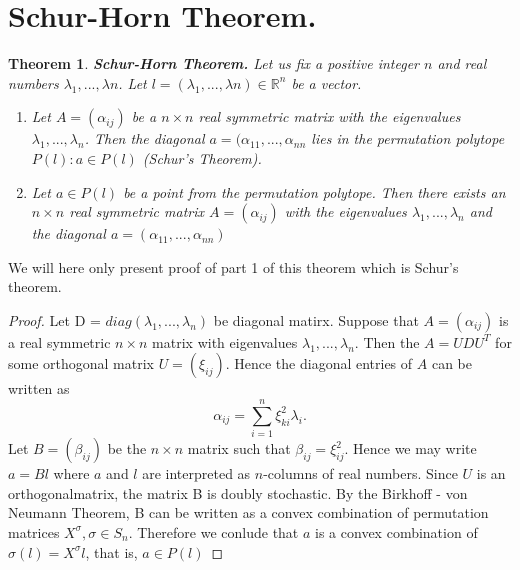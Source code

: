 \documentclass[11pt]{article}
\theoremstyle{plain}
\newtheorem{theorem}[thm]{Theorem}
\theoremstyle{definition}
\begin{document}
\section{Schur-Horn Theorem.}
\begin{theorem}\cite{Convexity}
    \textbf{Schur-Horn Theorem.} Let us fix a positive integer $n$ and real numbers $\lambda_{1},...,\lambda{n}$. Let $l=(\lambda_{1},...,\lambda{n}) \in \mathbb{R}^n$ be a vector.
    \begin{enumerate}
        \item [1.] Let $A=(\alpha_{ij})$ be a $n\times n$ real symmetric matrix with the eigenvalues $\lambda_{1},...,\lambda_{n}$. Then the diagonal $a = (\alpha_{11},...,\alpha_{nn}$ lies in the permutation polytope $P(l): a \in P(l)$ (Schur's Theorem).
        \item[2.] Let $a \in P(l)$ be a point from the permutation polytope. Then there exists an $n \times n$ real symmetric matrix $A=(\alpha_{ij})$ with the eigenvalues $\lambda_{1},...,\lambda_{n}$ and the diagonal $a = (\alpha_{11},...,\alpha_{nn})$
    \end{enumerate}
\end{theorem}
We will here only present proof of part 1 of this theorem which is Schur's theorem.
\begin{proof}
    Let D = $diag(\lambda_{1},...,\lambda_{n})$ be diagonal matirx. Suppose that $A=(\alpha_{ij})$ is a real symmetric $n\times n$ matrix with eigenvalues $\lambda_{1},...,\lambda_{n}$. Then the $A=UDU^T$ for some orthogonal matrix $U=(\xi_{ij})$. Hence the diagonal entries of $A$ can be written as
    $$ \alpha_{ij} = \sum_{i=1}^n\xi^{2}_{ki}\lambda_{i}.$$
    Let $B = (\beta_{ij})$ be the $n\times n$ matrix such that $\beta_{ij} = \xi^{2}_{ij}$. Hence we may write $a = Bl$ where $a$ and $l$ are interpreted as $n$-columns of real numbers. Since $U$ is an orthogonalmatrix, the matrix B is doubly stochastic. By the Birkhoff - von Neumann Theorem, B can be written as a convex combination of permutation matrices $X^\sigma, \sigma \in S_{n}$. Therefore we conlude that $a$ is a convex combination of $\sigma(l) = X^\sigma l$, that is, $a \in P(l)$
\end{proof}
\end{document}
